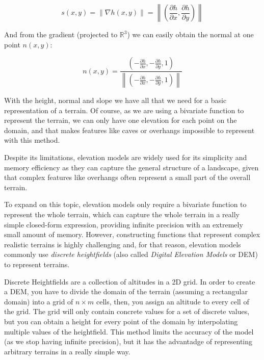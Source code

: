 \begin{equation}
s(x,y) = \left \lVert \nabla h(x,y) \right \rVert = \left \lVert(\frac{\partial h}{\partial x}, \frac{\partial h}{\partial y}) \right \rVert    
\end{equation}

And from the gradient (projected to $\mathbb{R}^3$) we can easily obtain 
the normal at one point $n(x,y)$:

\begin{equation}
n(x,y) = \frac{(-\frac{\partial h}{\partial x}, -\frac{\partial h}{\partial y}, 1)}
{\left \lVert (-\frac{\partial h}{\partial x}, -\frac{\partial h}{\partial y}, 1)\right \rVert }
\end{equation}

With the height, normal and slope we have all that we need for a basic 
representation of a terrain. Of course, as we are using a bivariate function
to represent the terrain, we can only have one elevation for each point 
on the domain, and that makes features like caves or overhangs impossible 
to represent with this method.

\vspace{10pt}

Despite its limitations, elevation models are widely used for its simplicity
and memory efficiency as they can capture the general structure of a landscape,
given that complex features like overhangs often represent a small part of the 
overall terrain.

\vspace{10pt}

To expand on this topic, elevation models only require a bivariate function
to represent the whole terrain, which can capture the whole terrain in a 
really simple closed-form expression, providing infinite precision with 
an extremely small amount of memory. However, constructing functions that
represent complex realistic terrains is highly challenging and, for that 
reason, elevation models commonly use \textit{discrete heightfields} 
(also called \textit{Digital Elevation Models} or DEM) to represent terrains.

\vspace{10pt}

Discrete Heightfields are a collection of altitudes in a 2D grid. In order 
to create a DEM, you have to divide the domain of the terrain (assuming a 
rectangular domain) into a grid of $n \times m$ cells, then, you assign an altitude
to every cell of the grid. The grid will only contain concrete values for
a set of discrete values, but you can obtain a height for every point of 
the domain by interpolating multiple values of the heightfield. This method
limits the accuracy of the model (as we stop having infinite precision), 
but it has the advantadge of representing arbitrary terrains in a really
simple way.

